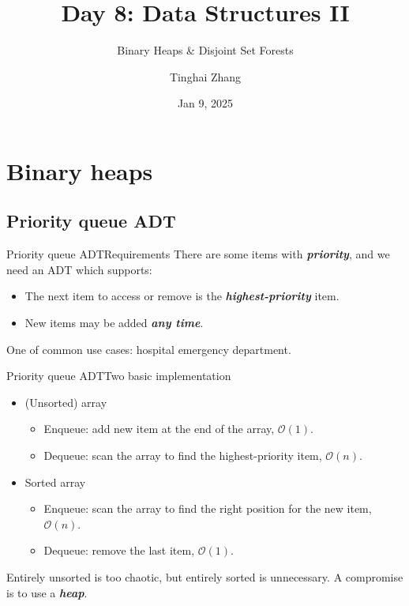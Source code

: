 \documentclass[aspectratio=169]{ctexbeamer}
\title{Day 8: Data Structures II}
\subtitle{Binary Heaps \& Disjoint Set Forests}
\author{Tinghai Zhang}
\date{Jan 9, 2025}
\newcommand{\highlight}[1]{\textbf{\textit{#1}}}
\begin{document}
    \begin{frame}
        \maketitle
    \end{frame}

    \section{Binary heaps}

    \subsection{Priority queue ADT}

    \begin{frame}{Priority queue ADT}{Requirements}
        There are some items with \highlight{priority}, and we need an ADT which supports:

        \begin{itemize}
            \item The next item to access or remove is the \highlight{highest-priority} item.
            \item New items may be added \highlight{any time}.
        \end{itemize}

        One of common use cases: hospital emergency department.
    \end{frame}

    \begin{frame}{Priority queue ADT}{Two basic implementation}
        \begin{itemize}
            \item (Unsorted) array
            \begin{itemize}
                \item Enqueue: add new item at the end of the array, $\mathcal O(1)$.
                \item Dequeue: scan the array to find the highest-priority item, $\mathcal O(n)$.
            \end{itemize}
            \item Sorted array
            \begin{itemize}
                \item Enqueue: scan the array to find the right position for the new item, $\mathcal O(n)$.
                \item Dequeue: remove the last item, $\mathcal O(1)$.
            \end{itemize}
        \end{itemize}
    
        Entirely unsorted is too chaotic, but entirely sorted is unnecessary. A compromise is to use a \highlight{heap}.
    \end{frame}
\end{document}
